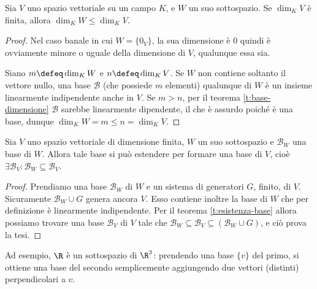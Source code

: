 \begin{teorema}
	Sia $V$ uno spazio vettoriale su un campo $K$, e $W$ un suo sottospazio.
	Se $\dim_K V$ è finita, allora $\dim_K W\leq\dim_K V$.
\end{teorema}
\begin{proof}
	Nel caso banale in cui $W=\{0_V\}$, la sua dimensione è 0 quindi è ovviamente minore o uguale della dimensione di $V$, qualunque essa sia.

	Siano $m\defeq\dim_K W$ e $n\defeq\dim_K V$.
	Se $W$ non contiene soltanto il vettore nullo, una base $\mathcal B$ (che possiede $m$ elementi) qualunque di $W$ è un insieme linearmente indipendente anche in $V$.
	Se $m>n$, per il teorema \ref{t:base-dimensione} $\mathcal B$ sarebbe linearmente dipendente, il che è assurdo poich\'e è una base, dunque $\dim_K W=m\le n=\dim_K V$.
\end{proof}

\begin{teorema}\label{estensione-base}
	Sia $V$ uno spazio vettoriale di dimensione finita, $W$ un suo sottospazio e $\mathcal B_W$ una base di $W$.
	Allora tale base si può estendere per formare una base di $V$, cioè $\exists\mathcal B_V\colon\mathcal B_W\subseteq\mathcal B_V$.
\end{teorema}
\begin{proof}
	Prendiamo una base $\mathcal B_W$ di $W$ e un sistema di generatori $G$, finito, di $V$.
	Sicuramente $\mathcal B_W\cup G$ genera ancora $V$.
	Esso contiene inoltre la base di $W$ che per definizione è linearmente indipendente.
	Per il teorema \ref{t:esistenza-base} allora possiamo trovare una base $\mathcal B_V$ di $V$ tale che $\mathcal B_W\subseteq \mathcal B_V\subseteq (\mathcal B_W\cup G)$, e ciò prova la tesi.
\end{proof}
Ad esempio, $\R$ è un sottospazio di $\R^3$: prendendo una base $\{  v\}$ del primo, si ottiene una base del secondo semplicemente aggiungendo due vettori (distinti) perpendicolari a $  v$.

